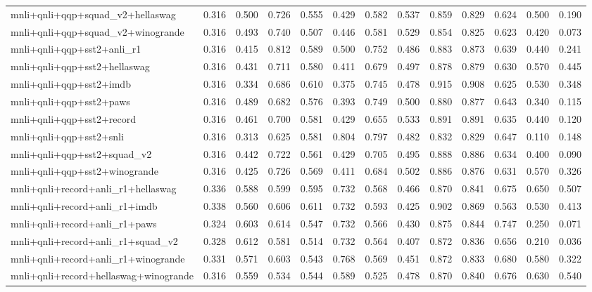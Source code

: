 \begin{table}[t]
\begin{tabular}{lrrrrrrrrrrrr}
    mnli+qnli+qqp+squad\_v2+hellaswag & 0.316 & 0.500 & 0.726 & 0.555 & 0.429 & 0.582 & 0.537 & 0.859 & 0.829 & 0.624 & 0.500 & 0.190 \\
    mnli+qnli+qqp+squad\_v2+winogrande & 0.316 & 0.493 & 0.740 & 0.507 & 0.446 & 0.581 & 0.529 & 0.854 & 0.825 & 0.623 & 0.420 & 0.073 \\
    mnli+qnli+qqp+sst2+anli\_r1 & 0.316 & 0.415 & 0.812 & 0.589 & 0.500 & 0.752 & 0.486 & 0.883 & 0.873 & 0.639 & 0.440 & 0.241 \\
    mnli+qnli+qqp+sst2+hellaswag & 0.316 & 0.431 & 0.711 & 0.580 & 0.411 & 0.679 & 0.497 & 0.878 & 0.879 & 0.630 & 0.570 & 0.445 \\
    mnli+qnli+qqp+sst2+imdb & 0.316 & 0.334 & 0.686 & 0.610 & 0.375 & 0.745 & 0.478 & 0.915 & 0.908 & 0.625 & 0.530 & 0.348 \\
    mnli+qnli+qqp+sst2+paws & 0.316 & 0.489 & 0.682 & 0.576 & 0.393 & 0.749 & 0.500 & 0.880 & 0.877 & 0.643 & 0.340 & 0.115 \\
    mnli+qnli+qqp+sst2+record & 0.316 & 0.461 & 0.700 & 0.581 & 0.429 & 0.655 & 0.533 & 0.891 & 0.891 & 0.635 & 0.440 & 0.120 \\
    mnli+qnli+qqp+sst2+snli & 0.316 & 0.313 & 0.625 & 0.581 & 0.804 & 0.797 & 0.482 & 0.832 & 0.829 & 0.647 & 0.110 & 0.148 \\
    mnli+qnli+qqp+sst2+squad\_v2 & 0.316 & 0.442 & 0.722 & 0.561 & 0.429 & 0.705 & 0.495 & 0.888 & 0.886 & 0.634 & 0.400 & 0.090 \\
    mnli+qnli+qqp+sst2+winogrande & 0.316 & 0.425 & 0.726 & 0.569 & 0.411 & 0.684 & 0.502 & 0.886 & 0.876 & 0.631 & 0.570 & 0.326 \\
    mnli+qnli+record+anli\_r1+hellaswag & 0.336 & 0.588 & 0.599 & 0.595 & 0.732 & 0.568 & 0.466 & 0.870 & 0.841 & 0.675 & 0.650 & 0.507 \\
    mnli+qnli+record+anli\_r1+imdb & 0.338 & 0.560 & 0.606 & 0.611 & 0.732 & 0.593 & 0.425 & 0.902 & 0.869 & 0.563 & 0.530 & 0.413 \\
    mnli+qnli+record+anli\_r1+paws & 0.324 & 0.603 & 0.614 & 0.547 & 0.732 & 0.566 & 0.430 & 0.875 & 0.844 & 0.747 & 0.250 & 0.071 \\
    mnli+qnli+record+anli\_r1+squad\_v2 & 0.328 & 0.612 & 0.581 & 0.514 & 0.732 & 0.564 & 0.407 & 0.872 & 0.836 & 0.656 & 0.210 & 0.036 \\
    mnli+qnli+record+anli\_r1+winogrande & 0.331 & 0.571 & 0.603 & 0.543 & 0.768 & 0.569 & 0.451 & 0.872 & 0.833 & 0.680 & 0.580 & 0.322 \\
    mnli+qnli+record+hellaswag+winogrande & 0.316 & 0.559 & 0.534 & 0.544 & 0.589 & 0.525 & 0.478 & 0.870 & 0.840 & 0.676 & 0.630 & 0.540 \\

\end{tabular}
\end{table}
